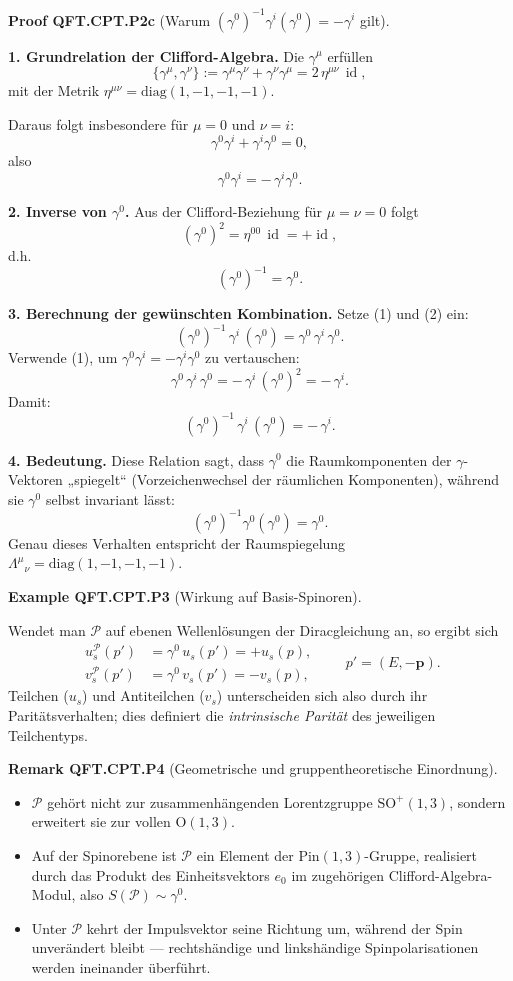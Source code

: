 \documentclass[10pt, letterpaper]{article}
\newcommand{\id}{\operatorname{id}}
\newcommand{\SO}{\mathrm{SO}}
\newcommand{\Pin}{\mathrm{Pin}}
\newcommand{\Ogroup}{\mathrm{O}}
\newcommand{\CustomHeading}[3]{%
  \par\medskip\noindent%
  \textbf{#1 #2} \textnormal{(#3)}.\enskip%
}
\newenvironment{REM}[2]{\begin{unitbox}\CustomHeading{Remark}{#1}{#2}}{\end{unitbox}}
\newenvironment{EXA}[2]{\begin{unitbox}\CustomHeading{Example}{#1}{#2}}{\end{unitbox}}
\newenvironment{PROOF}[2]{\begin{unitbox}\CustomHeading{Proof}{#1}{#2}}{\end{unitbox}}
\begin{document}
\begin{PROOF}{QFT.CPT.P2c}{Warum $(\gamma^0)^{-1}\gamma^i(\gamma^0)=-\gamma^i$ gilt}
\textbf{1. Grundrelation der Clifford-Algebra.}  
Die $\gamma^\mu$ erfüllen
\[
\{\gamma^\mu,\gamma^\nu\} := \gamma^\mu\gamma^\nu + \gamma^\nu\gamma^\mu = 2\,\eta^{\mu\nu}\,\id,
\]
mit der Metrik $\eta^{\mu\nu}=\mathrm{diag}(1,-1,-1,-1)$.

Daraus folgt insbesondere für $\mu=0$ und $\nu=i$:
\[
\gamma^0\gamma^i+\gamma^i\gamma^0 = 0,
\]
also
\[
\gamma^0\gamma^i = -\,\gamma^i\gamma^0.
\tag{1}
\]

\textbf{2. Inverse von $\gamma^0$.}  
Aus der Clifford-Beziehung für $\mu=\nu=0$ folgt
\[
(\gamma^0)^2 = \eta^{00}\,\id = +\id,
\]
d.h.
\[
(\gamma^0)^{-1} = \gamma^0.
\tag{2}
\]

\textbf{3. Berechnung der gewünschten Kombination.}
Setze (1) und (2) ein:
\[
(\gamma^0)^{-1}\,\gamma^i\,(\gamma^0)
= \gamma^0\,\gamma^i\,\gamma^0.
\]
Verwende (1), um $\gamma^0\gamma^i=-\gamma^i\gamma^0$ zu vertauschen:
\[
\gamma^0\,\gamma^i\,\gamma^0 = -\,\gamma^i\,(\gamma^0)^2 = -\,\gamma^i.
\]
Damit:
\[
\boxed{(\gamma^0)^{-1}\,\gamma^i\,(\gamma^0) = -\,\gamma^i.}
\]

\textbf{4. Bedeutung.}  
Diese Relation sagt, dass $\gamma^0$ die Raumkomponenten der $\gamma$-Vektoren „spiegelt“ (Vorzeichenwechsel der räumlichen Komponenten), während sie $\gamma^0$ selbst invariant lässt:
\[
(\gamma^0)^{-1}\gamma^0(\gamma^0)=\gamma^0.
\]
Genau dieses Verhalten entspricht der Raumspiegelung $\Lambda^\mu{}_\nu=\mathrm{diag}(1,-1,-1,-1)$.
\end{PROOF}

\begin{EXA}{QFT.CPT.P3}{Wirkung auf Basis-Spinoren}
Wendet man $\mathcal P$ auf ebenen Wellenlösungen der Diracgleichung an, so ergibt sich
\[
\begin{aligned}
u_s^{\mathcal P}(p') &= \gamma^0\,u_s(p') = +u_s(p),\\[4pt]
v_s^{\mathcal P}(p') &= \gamma^0\,v_s(p') = -v_s(p),
\end{aligned}
\qquad
p'=(E,-\mathbf p).
\]
Teilchen ($u_s$) und Antiteilchen ($v_s$) unterscheiden sich also durch ihr Paritätsverhalten; dies definiert die \emph{intrinsische Parität} des jeweiligen Teilchentyps.
\end{EXA}

\begin{REM}{QFT.CPT.P4}{Geometrische und gruppentheoretische Einordnung}
\begin{itemize}
  \item $\mathcal P$ gehört nicht zur zusammenhängenden Lorentzgruppe $\SO^+(1,3)$, sondern erweitert sie zur vollen $\Ogroup(1,3)$.
  \item Auf der Spinorebene ist $\mathcal P$ ein Element der $\Pin(1,3)$-Gruppe, realisiert durch das Produkt des Einheitsvektors $e_0$ im zugehörigen Clifford-Algebra-Modul, also $S(\mathcal P)\sim \gamma^0$.
  \item Unter $\mathcal P$ kehrt der Impulsvektor seine Richtung um, während der Spin unverändert bleibt — rechtshändige und linkshändige Spinpolarisationen werden ineinander überführt.
\end{itemize}
\end{REM}
\end{document}
